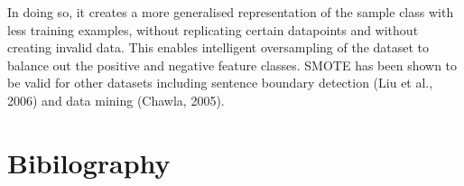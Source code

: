 \documentclass{article}
\begin{document}
In doing so, it creates a more generalised representation of the sample class with less training examples, without replicating certain datapoints and without creating invalid data. This enables intelligent oversampling of the dataset to balance out the positive and negative feature classes. SMOTE has been shown to be valid for other datasets including sentence boundary detection (Liu et al., 2006) and data mining (Chawla, 2005).
\newpage
\section{Bibilography}

\begin{list}{}{%
\setlength{\topsep}{0pt}%
\setlength{\leftmargin}{0.5in}%
\setlength{\listparindent}{-0.5in}%
\setlength{\itemindent}{-0.5in}%
\setlength{\parsep}{\parskip}%
}%

\end{list}
\end{document}
